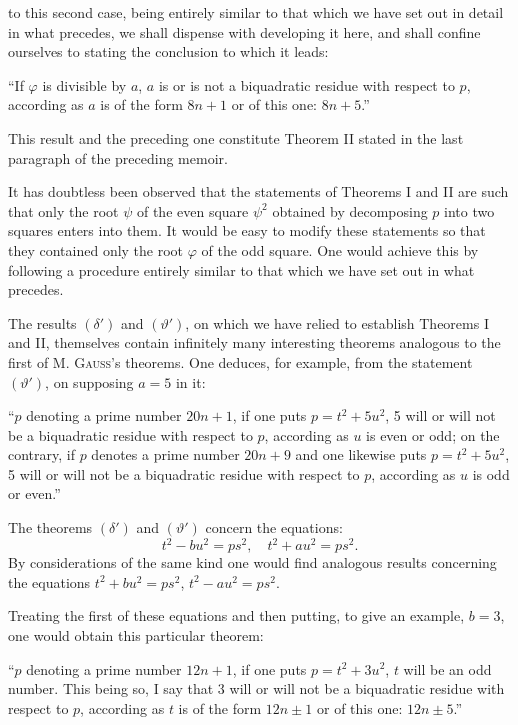 \noindent
to this second case, being entirely similar to that which we have set out
in detail in what precedes, we shall dispense with developing it here,
and shall confine ourselves to stating the conclusion to which it leads:
\par\indent
“If $\varphi$ is divisible by $a$, $a$ is or is not a biquadratic residue with
respect to $p$, according as $a$ is of the form $8n+1$ or of this one: $8n+5$.”
\par\indent
This result and the preceding one constitute Theorem II stated in
the last paragraph of the preceding memoir.
\par\indent
It has doubtless been observed that the statements of Theorems I and II are
such that only the root $\psi$ of the even square $\psi^2$ obtained by decomposing
$p$ into two squares enters into them. It would be easy to modify these statements so
that they contained only the root $\varphi$ of the odd square. One
would achieve this by following a procedure entirely similar to that which we
have set out in what precedes.
\par\indent
The results $(\delta')$ and $(\vartheta')$, on which we have relied to
establish Theorems I and II, themselves contain infinitely many
interesting theorems analogous to the first of M. \textsc{Gauss}'s theorems. One deduces, for
example, from the statement $(\vartheta')$, on supposing $a=5$ in it:
\par\indent
“$p$ denoting a prime number $20n+1$, if one puts $p=t^2+5u^2$,
5 will or will not be a biquadratic residue with respect to $p$, according as $u$ is
even or odd; on the contrary, if $p$ denotes a prime number $20n+9$ and one
likewise puts $p=t^2+5u^2$, 5 will or will not be a biquadratic residue with
respect to $p$, according as $u$ is odd or even.”
\par\indent
The theorems $(\delta')$ and $(\vartheta')$ concern the equations:
\[
t^2-bu^2=ps^2,\quad t^2+au^2=ps^2.
\]
By considerations of the same kind one would find analogous results
concerning the equations $t^2+bu^2=ps^2$, $t^2-au^2=ps^2$.
\par\indent
Treating the first of these equations and then putting, to give
an example, $b=3$, one would obtain this particular theorem:
\par\indent
“$p$ denoting a prime number $12n+1$, if one puts $p=t^2+3u^2$, $t$
will be an odd number. This being so, I say that 3 will or will not be a biquadratic
residue with respect to $p$, according as $t$ is of the form $12n\pm1$ or of
this one: $12n\pm5$.”
\par\vspace{16pt}{\centering\rule{.24\linewidth}{.3pt}\par}
